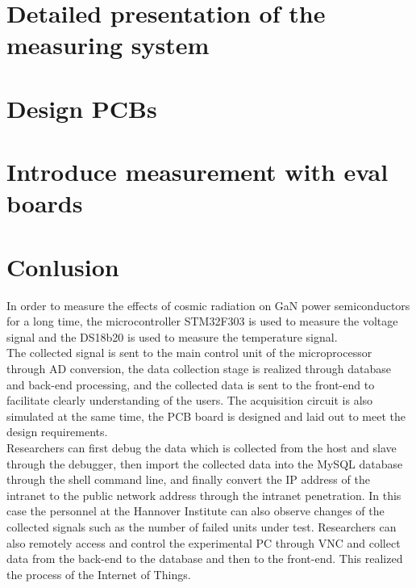 \chapter{Detailed presentation of the measuring system}
\label{chap:Detailed presentation of the measuring system}


\chapter{Design PCBs}
\label{chap:Design PCBs}

\chapter{Introduce measurement with eval boards }
\label{chap:Introduce measurement with eval boards }
 

\chapter{Conlusion}
\label{chap:Conlusion}
In order to measure the effects of cosmic radiation on GaN power semiconductors for a long time, the microcontroller STM32F303 is used to measure the voltage signal and the DS18b20 is used to measure the temperature signal.
\\
The collected signal is sent to the main control unit of the microprocessor through AD conversion, the data collection stage is realized through database and back-end processing, and the collected data is sent to the front-end to facilitate clearly understanding of the users.
The acquisition circuit is also simulated at the same time, the PCB board is designed and laid out to meet the design requirements.
\\
Researchers can first debug the data which is collected from the host and slave through the debugger, then import the collected data into the MySQL database through the shell command line, and finally convert the IP address of the intranet to the public network address through the intranet penetration. In this case the personnel at the Hannover Institute can also observe changes of the collected signals such as the number of failed units under test. Researchers can also remotely access and control the experimental PC through VNC and collect data from the back-end to the database and then to the front-end. This realized the process of the Internet of Things.
